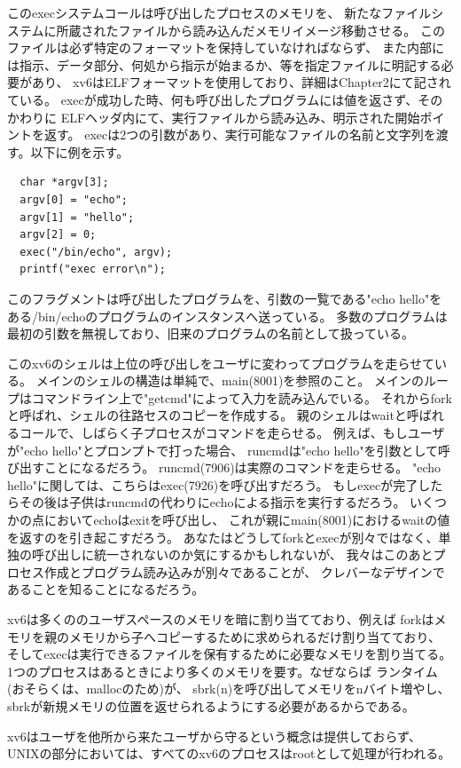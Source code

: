 \documentclass[11pt,a4paper, uplatex]{jsarticle}
\begin{document}
このexecシステムコールは呼び出したプロセスのメモリを、
新たなファイルシステムに所蔵されたファイルから読み込んだメモリイメージ移動させる。
このファイルは必ず特定のフォーマットを保持していなければならず、
また内部には指示、データ部分、何処から指示が始まるか、等を指定ファイルに明記する必要があり、
xv6はELFフォーマットを使用しており、詳細はChapter2にて記されている。
execが成功した時、何も呼び出したプログラムには値を返さず、そのかわりに
ELFヘッダ内にて、実行ファイルから読み込み、明示された開始ポイントを返す。
execは2つの引数があり、実行可能なファイルの名前と文字列を渡す。以下に例を示す。
\begin{lstlisting}
  char *argv[3];
  argv[0] = "echo";
  argv[1] = "hello";
  argv[2] = 0;
  exec("/bin/echo", argv);
  printf("exec error\n");
\end{lstlisting}
このフラグメントは呼び出したプログラムを、引数の一覧である"echo hello"を
ある/bin/echoのプログラムのインスタンスへ送っている。
多数のプログラムは最初の引数を無視しており、旧来のプログラムの名前として扱っている。

このxv6のシェルは上位の呼び出しをユーザに変わってプログラムを走らせている。
メインのシェルの構造は単純で、main(8001)を参照のこと。
メインのループはコマンドライン上で"getcmd"によって入力を読み込んでいる。
それからforkと呼ばれ、シェルの往路セスのコピーを作成する。
親のシェルはwaitと呼ばれるコールで、しばらく子プロセスがコマンドを走らせる。
例えば、もしユーザが"echo hello"とプロンプトで打った場合、
runcmdは"echo hello"を引数として呼び出すことになるだろう。
runcmd(7906)は実際のコマンドを走らせる。
"echo hello"に関しては、こちらはexec(7926)を呼び出すだろう。
もしexecが完了したらその後は子供はruncmdの代わりにechoによる指示を実行するだろう。
いくつかの点においてechoはexitを呼び出し、
これが親にmain(8001)におけるwaitの値を返すのを引き起こすだろう。
あなたはどうしてforkとexecが別々ではなく、単独の呼び出しに統一されないのか気にするかもしれないが、
我々はこのあとプロセス作成とプログラム読み込みが別々であることが、
クレバーなデザインであることを知ることになるだろう。

xv6は多くののユーザスペースのメモリを暗に割り当てており、例えば
forkはメモリを親のメモリから子へコピーするために求められるだけ割り当てており、
そしてexecは実行できるファイルを保有するために必要なメモリを割り当てる。
1つのプロセスはあるときにより多くのメモリを要す。なぜならば
ランタイム(おそらくは、mallocのため)が、
sbrk(n)を呼び出してメモリをnバイト増やし、
sbrkが新規メモリの位置を返せられるようにする必要があるからである。

xv6はユーザを他所から来たユーザから守るという概念は提供しておらず、
UNIXの部分においては、すべてのxv6のプロセスはrootとして処理が行われる。
%
%
\end{document}
